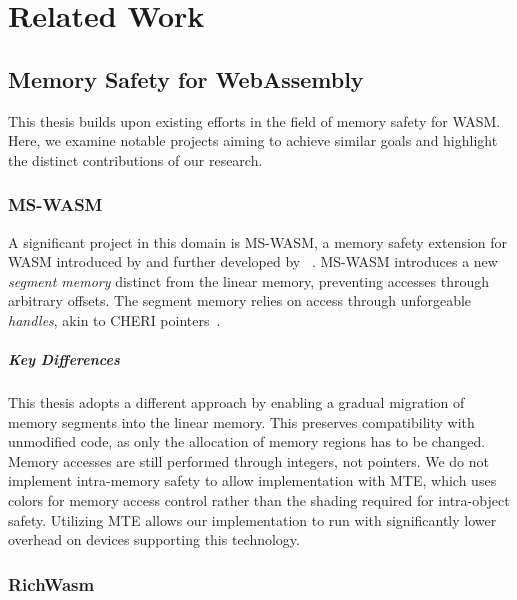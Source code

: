 \chapter{Related Work}
\label{ch:related}

\section{Memory Safety for WebAssembly}
\label{sec:related-memory-safety-for-webassembly}

This thesis builds upon existing efforts in the field of memory safety for \ac{WASM}.
Here, we examine notable projects aiming to achieve similar goals and highlight the distinct contributions of our research.

\subsection{MS-WASM}
\label{subsec:ms-wasm}

A significant project in this domain is MS-WASM, a memory safety extension for WASM introduced by \citeauthor*{disselkoen2019position} and further developed by \citeauthor*{michael2023mswasm}~\cite{disselkoen2019position,michael2023mswasm}.
MS-WASM introduces a new \textit{segment memory} distinct from the linear memory, preventing accesses through arbitrary offsets.
The segment memory relies on access through unforgeable \textit{handles}, akin to CHERI pointers~\cite{woodruff2014cheri}.

\paragraph{Key Differences}
This thesis adopts a different approach by enabling a gradual migration of memory segments into the linear memory.
This preserves compatibility with unmodified code, as only the allocation of memory regions has to be changed.
Memory accesses are still performed through integers, not pointers.
We do not implement intra-memory safety to allow implementation with \ac{MTE}, which uses colors for memory access control rather than the shading required for intra-object safety.
Utilizing \ac{MTE} allows our implementation to run with significantly lower overhead on devices supporting this technology.

\subsection{RichWasm}
\label{subsec:richwasm}

